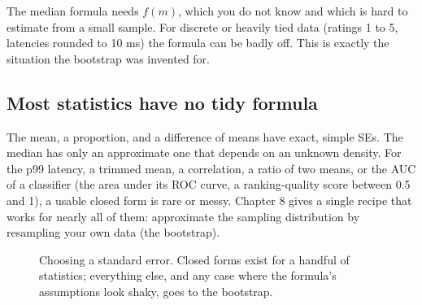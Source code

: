 \begin{trapbox}
The median formula needs $f(m)$, which you do not know and which is hard to
estimate from a small sample. For discrete or heavily tied data (ratings 1 to 5,
latencies rounded to 10 ms) the formula can be badly off. This is exactly the
situation the bootstrap was invented for.
\end{trapbox}

\subsection{Most statistics have no tidy formula}

The mean, a proportion, and a difference of means have exact, simple SEs. The
median has only an approximate one that depends on an unknown density. For the
p99 latency, a trimmed mean, a correlation, a ratio of two means, or the AUC of a
classifier (the area under its ROC curve, a ranking-quality score between 0.5
and 1), a usable closed form is rare or messy. Chapter 8 gives a single
recipe that works for nearly all of them: approximate the sampling distribution by
resampling your own data (the bootstrap).

\begin{figure}[H]
\centering
{}
\caption{Choosing a standard error. Closed forms exist for a handful of
statistics; everything else, and any case where the formula's assumptions look
shaky, goes to the bootstrap.}
\label{fig:sd-choose}
\end{figure}


